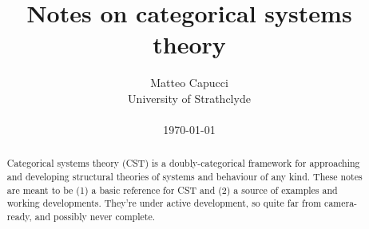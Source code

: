 \documentclass[english]{paper}
\title{Notes on categorical systems theory}
\author{Matteo Capucci\\University of Strathclyde\\\\\today}
\begin{document}
	\maketitle

	\begin{abstract}
		Categorical systems theory (CST) is a doubly-categorical framework for approaching and developing structural theories of systems and behaviour of any kind.
		These notes are meant to be (1) a basic reference for CST and (2) a source of examples and working developments.
		They're under active development, so quite far from camera-ready, and possibly never complete.
	\end{abstract}

	
	
	
	

	\printbibliography
\end{document}
